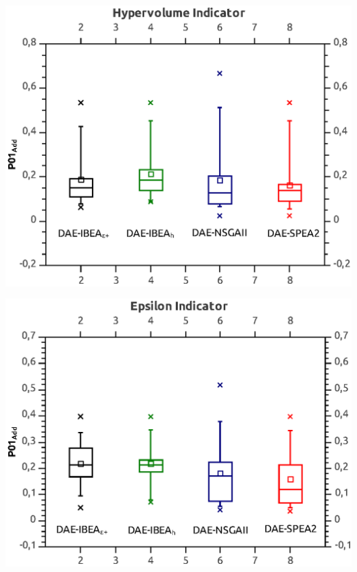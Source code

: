 \documentclass[a4paper,10pt]{report} %
\begin{document}
\begin{center}
 \includegraphics{./bp_p01_add_hyper.eps}
\end{center}
\begin{center}
 \includegraphics[bb=0 0 370 303]{./bp_p01_Add_eps.eps}
\end{center}
\end{document}
